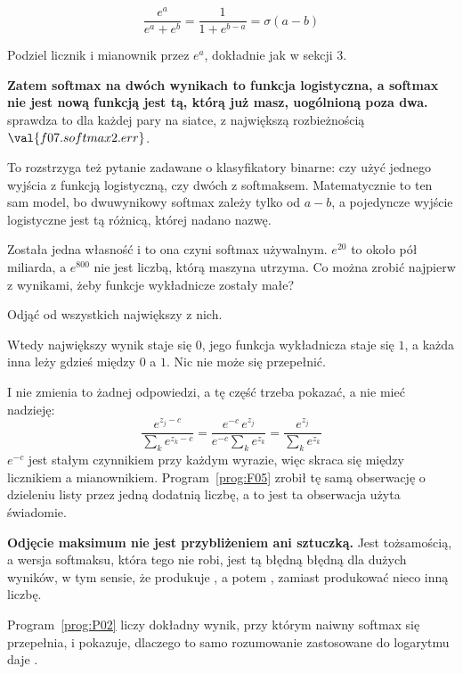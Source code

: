 \begin{fr}
\begin{ansblock}
\[ \frac{e^{a}}{e^{a} + e^{b}}
   = \frac{1}{1 + e^{b-a}} = \sigma(a - b) \]
\end{ansblock}

Podziel licznik i mianownik przez $e^{a}$, dokładnie jak w sekcji 3.

\textbf{Zatem softmax na dwóch wynikach to funkcja logistyczna, a softmax nie
jest nową funkcją \dash{} jest tą, którą już masz, uogólnioną poza dwa.}
 sprawdza to dla każdej pary na siatce, z
największą rozbieżnością $\val{f07.softmax2.err}$.

To rozstrzyga też pytanie zadawane o klasyfikatory binarne: czy użyć jednego
wyjścia z funkcją logistyczną, czy dwóch z softmaksem. Matematycznie to ten
sam model, bo dwuwynikowy softmax zależy tylko od $a - b$, a pojedyncze
wyjście logistyczne jest tą różnicą, której nadano nazwę.

Została jedna własność i to ona czyni softmax używalnym. $e^{20}$ to około pół
miliarda, a $e^{800}$ nie jest liczbą, którą maszyna utrzyma. Co można zrobić
najpierw z wynikami, żeby funkcje wykładnicze zostały małe?
\nextframe
\end{fr}

\begin{fr}
\begin{ansblock}
Odjąć od wszystkich największy z nich.
\end{ansblock}

Wtedy największy wynik staje się $0$, jego funkcja wykładnicza staje się $1$, a
każda inna leży gdzieś między $0$ a $1$. Nic nie może się przepełnić.

I nie zmienia to żadnej odpowiedzi, a tę część trzeba pokazać, a nie mieć
nadzieję:
\[ \frac{e^{z_j - c}}{\sum_k e^{z_k - c}}
   = \frac{e^{-c}\,e^{z_j}}{e^{-c}\sum_k e^{z_k}}
   = \frac{e^{z_j}}{\sum_k e^{z_k}} \]
$e^{-c}$ jest stałym czynnikiem przy każdym wyrazie, więc skraca się między
licznikiem a mianownikiem. Program~\ref{prog:F05} zrobił tę samą obserwację o
dzieleniu listy przez jedną dodatnią liczbę, a to jest ta obserwacja użyta
świadomie.

\begin{warning}
\textbf{Odjęcie maksimum nie jest przybliżeniem ani sztuczką.} Jest
tożsamością, a wersja softmaksu, która tego nie robi, jest tą błędną \dash{}
błędną dla dużych wyników, w tym sensie, że produkuje , a potem
, zamiast produkować nieco inną liczbę.

Program~\ref{prog:P02} liczy dokładny wynik, przy którym naiwny softmax się
przepełnia, i pokazuje, dlaczego to samo rozumowanie zastosowane do logarytmu
daje .
\end{warning}
\end{fr}

